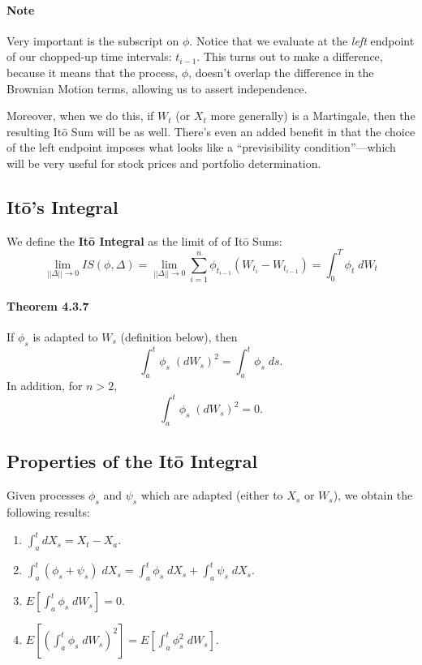 \documentclass[a4paper,12pt]{scrartcl}
\begin{document}
\paragraph{Note} Very important is the subscript on $\phi$.  Notice that
we evaluate at the \emph{left} endpoint of our chopped-up time 
intervals: $t_{i-1}$.  This turns out to make a difference, because it
means that the process, $\phi$, doesn't overlap the difference in the 
Brownian Motion terms, allowing us to assert independence.

Moreover, when we do this, if $W_t$ (or $X_t$ more generally) is a 
Martingale, then the resulting It\={o} Sum will be as well. There's 
even an added benefit in that the choice of the left endpoint
imposes what looks like a ``previsibility condition''---which will
be very useful for stock prices and portfolio determination.

\subsection{It\={o}'s Integral}

We define the \textbf{It\={o} Integral} as the limit of of It\={o}
Sums:
   \[ \lim_{||\Delta|| \rightarrow 0}IS(\phi,\Delta) =  
      \lim_{||\Delta|| \rightarrow 0} \sum^n_{i=1} \phi_{t_{i-1}}(W_{t_i}
      -W_{t_{i-1}})= \int_0^T \phi_t \;dW_t \]

\paragraph{Theorem 4.3.7} If $\phi_s$ is adapted to $W_s$ (definition
below), then 
   \[ \int_a^t \phi_s \; (dW_s)^2 = \int_a^t \phi_s \; ds.\]
In addition, for $n>2$,
   \[ \int_a^t \phi_s \; (dW_s)^2 = 0. \]


\subsection{Properties of the It\={o} Integral}

Given processes $\phi_s$ and $\psi_s$ which are adapted (either to 
$X_s$ or $W_s$), we obtain the following results:
\begin{enumerate}
   \item{$\int_a^t dX_s = X_t - X_a$.}
   \item{$\int_a^t (\phi_s + \psi_s)\; dX_s = \int_a^t \phi_s \; dX_s + 
      \int_a^t \psi_s \; dX_s$.}
   \item{$E\left[\int_a^t \phi_s \;dW_s \right] = 0$.}
   \item{$E\left[\left(\int_a^t \phi_s \;dW_s\right)^2 \right] = 
      E\left[\int_a^t \phi^2_s \;dW_s \right]$.}
\end{enumerate}
\end{document}
